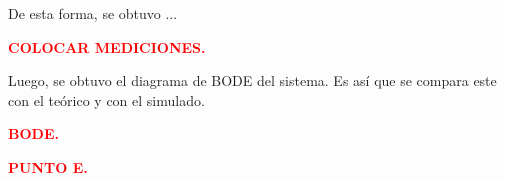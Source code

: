 \documentclass[11pt, a4paper]{article}
\begin{document}
De esta forma, se obtuvo ...
\begin{center}
	\textcolor{red}{\textbf{COLOCAR MEDICIONES.}}
\end{center} 

Luego, se obtuvo el diagrama de BODE del sistema. Es así que se compara este con el teórico y con el simulado.

\begin{center}
	\textcolor{red}{\textbf{BODE.}}
\end{center}

\begin{center}
	\textcolor{red}{\textbf{PUNTO E.}}
\end{center}
\end{document}
